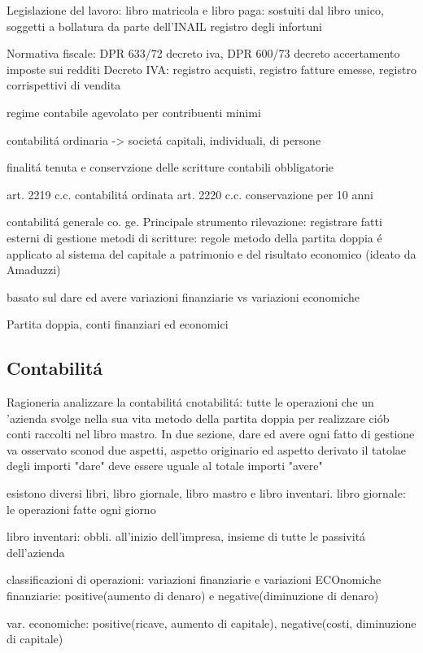 \documentclass{article}
\begin{document}
Legislazione del lavoro: libro matricola e libro paga: sostuiti dal libro unico, soggetti a bollatura da parte dell'INAIL
registro degli infortuni

Normativa fiscale: 
DPR 633/72 decreto iva, DPR 600/73 decreto accertamento imposte sui redditi
Decreto IVA: registro acquisti, registro fatture emesse, registro corrispettivi di vendita

regime contabile agevolato per contribuenti minimi

contabilit\'a ordinaria -> societ\'a capitali, individuali, di persone

finalit\'a tenuta e conservzione delle scritture contabili obbligatorie

art. 2219 c.c. contabilit\'a ordinata
art. 2220 c.c. conservazione per 10 anni

contabilit\'a generale
co. ge.
Principale strumento rilevazione: registrare fatti esterni di gestione
metodi di scritture: regole
metodo della partita doppia \'e applicato al sistema del capitale a patrimonio e del risultato economico
(ideato da Amaduzzi)

basato sul dare ed avere
variazioni finanziarie vs variazioni economiche

Partita doppia, conti finanziari ed economici

\subsection{Contabilit\'a}
Ragioneria analizzare la contabilit\'a 
cnotabilit\'a: tutte le operazioni che un 'azienda svolge nella sua vita
metodo della partita doppia per realizzare ci\'ob
conti raccolti nel libro mastro. In due sezione, dare ed avere
ogni fatto di gestione va osservato sconod due aspetti, aspetto originario ed aspetto derivato
il tatolae degli importi "dare" deve essere uguale al totale importi "avere"

esistono diversi libri, libro giornale, libro mastro e libro inventari.
libro giornale: le operazioni fatte ogni giorno

libro inventari: obbli. all'inizio dell'impresa, insieme di tutte le passivit\'a dell'azienda

classificazioni di operazioni:
variazioni finanziarie e variazioni ECOnomiche
finanziarie: positive(aumento di denaro) e negative(diminuzione di denaro)

var. economiche: positive(ricave, aumento di capitale), negative(costi, diminuzione di capitale)
\end{document}
